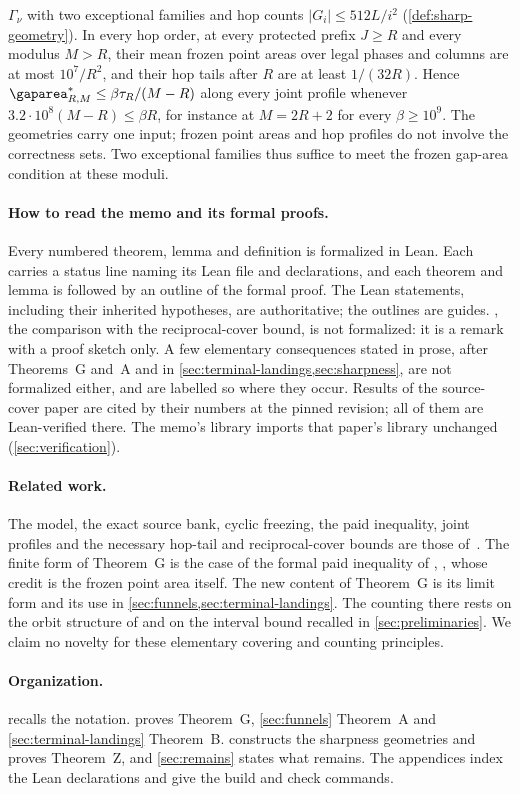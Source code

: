 \begin{enumerate}
$\Gamma_\nu$ with two exceptional families and hop counts $|G_i|\le512L/i^2$
(\cref{def:sharp-geometry}). In every hop order, at every protected prefix $J\ge R$ and
every modulus $M>R$, their mean frozen point areas over legal phases and columns are at
most $10^7/R^2$, and their hop tails after $R$ are at least $1/(32R)$. Hence
$\limarea_{R,M}\le\beta\tau_R/(M-R)$ along every joint profile whenever
$3.2\cdot10^8(M-R)\le\beta R$, for instance at $M=2R+2$ for every $\beta\ge10^9$.
The geometries carry one input; frozen point areas and hop profiles do not involve the
correctness sets. Two exceptional families thus suffice to meet the frozen gap-area
condition at these moduli.
\end{enumerate}

\paragraph{How to read the memo and its formal proofs.}
Every numbered theorem, lemma and definition is formalized in Lean. Each carries a
status line naming its Lean file and declarations, and each theorem and lemma is
followed by an outline of the formal proof. The Lean statements, including their
inherited hypotheses, are authoritative; the outlines are guides.
, the comparison with the reciprocal-cover bound, is
not formalized: it is a remark with a proof sketch only. A few elementary consequences
stated in prose, after Theorems~G and~A and in \cref{sec:terminal-landings,sec:sharpness},
are not formalized either, and are labelled so where they occur. Results of the
source-cover paper are cited by their numbers at the pinned revision; all of them are
Lean-verified there. The memo's library imports that paper's library unchanged
(\cref{sec:verification}).

\paragraph{Related work.}
The model, the exact source bank, cyclic freezing, the paid inequality, joint profiles
and the necessary hop-tail and reciprocal-cover bounds are those
of~\cite{SourceCovers2026}. The finite form of Theorem~G is the case of the formal paid
inequality of \cite[Theorem~3.5]{SourceCovers2026},
, whose credit is the frozen point area
itself. The new content of Theorem~G is its limit form and its use in
\cref{sec:funnels,sec:terminal-landings}. The counting there rests on the orbit
structure of \cite[Lemma~2.6]{SourceCovers2026} and on the interval bound recalled in
\cref{sec:preliminaries}. We claim no novelty for these elementary covering and
counting principles.

\paragraph{Organization.}
 recalls the notation.  proves Theorem~G,
\cref{sec:funnels} Theorem~A and \cref{sec:terminal-landings} Theorem~B.
 constructs the sharpness geometries and proves Theorem~Z, and
\cref{sec:remains} states what remains. The appendices index the Lean declarations and give the build
and check commands.

